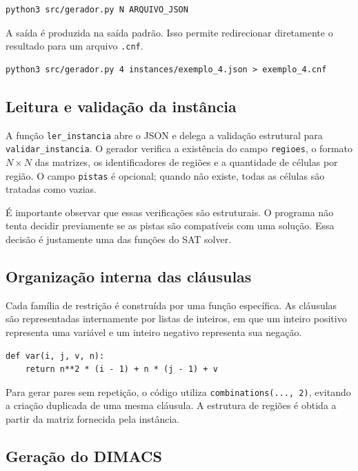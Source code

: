 \documentclass[a4paper, 12pt]{article}
\begin{document}
\begin{verbatim}
python3 src/gerador.py N ARQUIVO_JSON
\end{verbatim}

A saída é produzida na saída padrão. Isso permite redirecionar diretamente o resultado para um arquivo \texttt{.cnf}.

\begin{verbatim}
python3 src/gerador.py 4 instances/exemplo_4.json > exemplo_4.cnf
\end{verbatim}

\subsection{Leitura e validação da instância}

A função \texttt{ler\_instancia} abre o JSON e delega a validação estrutural para \texttt{validar\_instancia}. O gerador verifica a existência do campo \texttt{regioes}, o formato \(N\times N\) das matrizes, os identificadores de regiões e a quantidade de células por região. O campo \texttt{pistas} é opcional; quando não existe, todas as células são tratadas como vazias.

É importante observar que essas verificações são estruturais. O programa não tenta decidir previamente se as pistas são compatíveis com uma solução. Essa decisão é justamente uma das funções do SAT solver.

\subsection{Organização interna das cláusulas}

Cada família de restrição é construída por uma função específica. As cláusulas são representadas internamente por listas de inteiros, em que um inteiro positivo representa uma variável e um inteiro negativo representa sua negação.

\begin{verbatim}
def var(i, j, v, n):
    return n**2 * (i - 1) + n * (j - 1) + v
\end{verbatim}

Para gerar pares sem repetição, o código utiliza \texttt{combinations(..., 2)}, evitando a criação duplicada de uma mesma cláusula. A estrutura de regiões é obtida a partir da matriz fornecida pela instância.

\subsection{Geração do DIMACS}
\end{document}
